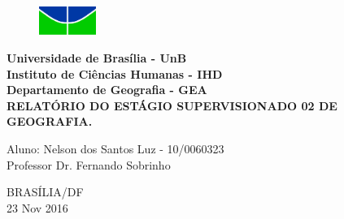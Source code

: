\begin{titlepage}
\begin{center}
\begin{figure}[!htpb]
        \centering
        \includegraphics[width=5em]{logo/logoUnB.jpg}
\end{figure}
{\large \textbf{Universidade de Brasília - UnB}}\\[0.2cm]
{\large \textbf{Instituto de Ciências Humanas - IHD}}\\[0.2cm]
{\large \textbf{Departamento de Geografia - GEA}}\\[4.1cm]
{\bf \huge  RELATÓRIO DO ESTÁGIO SUPERVISIONADO 02 DE GEOGRAFIA.}\\[4.1cm]
\end{center}
{\large Aluno: Nelson dos Santos Luz - 10/0060323}\\[0.7cm]
{\large Professor Dr. Fernando Sobrinho }\\[4.1cm]
\begin{center}
{\large BRASÍLIA/DF}\\[0.2cm]
{\large 23 Nov 2016}
\end{center}
\end{titlepage}
